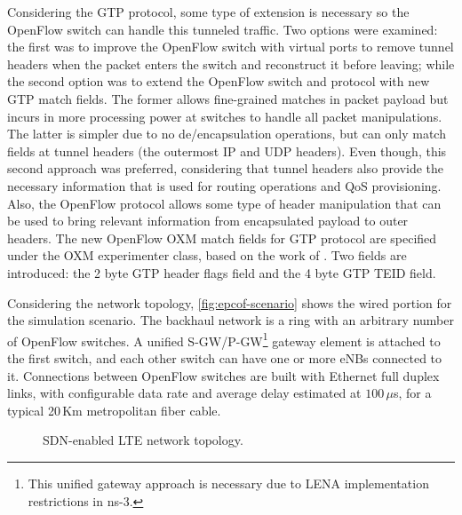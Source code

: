 Considering the \ac{GTP} protocol, some type of extension is necessary so the
OpenFlow switch can handle this tunneled traffic. Two options were examined:
the first was to improve the OpenFlow switch with virtual ports to remove
tunnel headers when the packet enters the switch and reconstruct it before
leaving; while the second option was to extend the OpenFlow switch and protocol
with new \ac{GTP} match fields. The former allows fine-grained matches in
packet payload but incurs in more processing power at switches to handle all
packet manipulations. The latter is simpler due to no de/encapsulation
operations, but can only match fields at tunnel headers (the outermost \ac{IP}
and \ac{UDP} headers). Even though, this second approach was preferred,
considering that tunnel headers also provide the necessary information that is
used for routing operations and \ac{QoS} provisioning. Also, the OpenFlow
protocol allows some type of header manipulation that can be used to bring
relevant information from encapsulated payload to outer headers. The new
OpenFlow \ac{OXM} match fields for \ac{GTP} protocol are specified under the
\ac{OXM} experimenter class, based on the work of \citet{Kempf2012a}. Two
fields are introduced: the 2 byte \ac{GTP} header flags field and the 4 byte
\ac{GTP} \ac{TEID} field.

Considering the network topology, \autoref{fig:epcof-scenario} shows the wired
portion for the simulation scenario. The backhaul network is a ring with an
arbitrary number of OpenFlow switches. A unified
\ac{S-GW}/\ac{P-GW}\footnote{This unified gateway approach is necessary due to
\ac{LENA} implementation restrictions in \ac{ns-3}.} gateway element is
attached to the first switch, and each other switch can have one or more
\acp{eNB} connected to it. Connections between OpenFlow switches are built with
Ethernet full duplex links, with configurable data rate and average delay
estimated at $100\,\mu$s, for a typical 20\,Km metropolitan fiber cable.

\begin{figure}[htb]
  \centering
  \hfil \hspace{1cm}
  \caption{\acs{SDN}-enabled \acs{LTE} network topology.}
  \label{fig:topology}
\end{figure}

